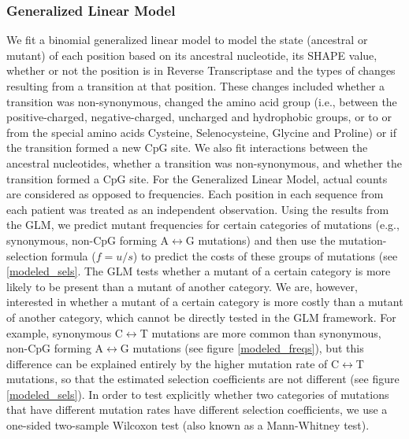 \documentclass{article}
\begin{document}
\subsubsection*{Generalized Linear Model}
We fit a binomial generalized linear model to model the state (ancestral or mutant) of each position based on its ancestral nucleotide, its SHAPE value, whether or not the position is in Reverse Transcriptase and the types of changes resulting from a transition at that position. These changes included whether a transition was non-synonymous, changed the amino acid group (i.e., between the positive-charged, negative-charged, uncharged and hydrophobic groups, or to or from the special amino acids 
Cysteine, Selenocysteine, Glycine and Proline) or if the transition formed a new CpG site. We also fit interactions between the ancestral nucleotides, whether a transition was non-synonymous, and whether the transition formed a CpG site.  For the Generalized Linear Model, actual counts are considered as opposed to frequencies. Each position in each sequence from each patient was treated as an independent observation.
Using the results from the GLM, we predict mutant frequencies for certain categories of mutations (e.g., synonymous, non-CpG forming  A$\leftrightarrow$G mutations) and then use the mutation-selection formula ($f = u / s$) to predict the costs of these groups of mutations (see \ref{modeled_sels}. The GLM tests whether a mutant of a certain category is more likely to be present than a mutant of another category. We are, however, interested in whether a mutant of a certain category is more costly than a mutant of another category, which cannot be directly tested in the GLM framework. For example, synonymous C$\leftrightarrow$T mutations are more common than synonymous, non-CpG forming A$\leftrightarrow$G mutations (see figure \ref{modeled_freqs}), but this difference can be explained entirely by the higher mutation rate of C$\leftrightarrow$T mutations, so that the estimated selection coefficients are not different (see figure \ref{modeled_sels}). In order to test explicitly whether two categories of mutations that have different mutation rates have different selection coefficients, we use a one-sided two-sample Wilcoxon test (also known as a Mann-Whitney test). 
\end{document}
